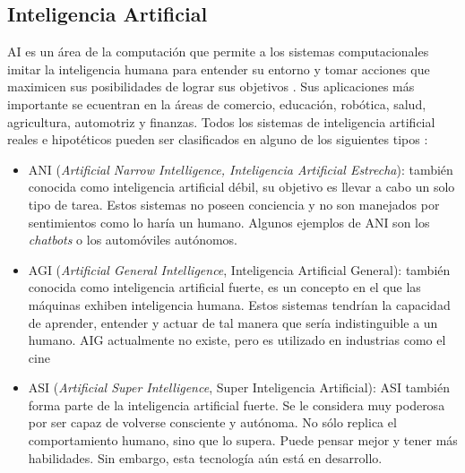 \subsection{Inteligencia Artificial}
AI es un área de la computación que permite a los sistemas computacionales imitar la inteligencia humana para entender su entorno y tomar acciones que maximicen sus posibilidades de lograr sus objetivos \cite{ai_def}. Sus aplicaciones más importante se ecuentran en la áreas de comercio, educación, robótica, salud, agricultura, automotriz y finanzas\cite{ai_apps}. Todos los sistemas de inteligencia artificial reales e hipotéticos pueden ser clasificados en alguno de los siguientes tipos \cite{ai_types}:
\begin{itemize}
	\item ANI (\textit{Artificial Narrow Intelligence, Inteligencia Artificial Estrecha}): también conocida como inteligencia artificial débil, su objetivo es llevar a cabo un solo tipo de tarea. Estos sistemas no poseen conciencia y no son manejados por sentimientos como lo haría un humano. Algunos ejemplos de ANI son los \textit{chatbots } o los automóviles autónomos.
	\item AGI (\textit{Artificial General Intelligence}, Inteligencia Artificial General): también conocida como inteligencia artificial fuerte, es un concepto en el que las máquinas exhiben inteligencia humana. Estos sistemas tendrían la capacidad de aprender, entender y actuar de tal manera que sería indistinguible a un humano. AIG actualmente no existe, pero es utilizado en industrias como el cine
	\item ASI (\textit{Artificial Super Intelligence}, Super Inteligencia Artificial): ASI también forma parte de la inteligencia artificial fuerte. Se le considera muy poderosa por ser capaz de volverse consciente y autónoma.
No sólo replica el comportamiento humano, sino que lo supera. Puede pensar mejor y tener más habilidades. Sin embargo, esta tecnología aún está en desarrollo.
\end{itemize}

